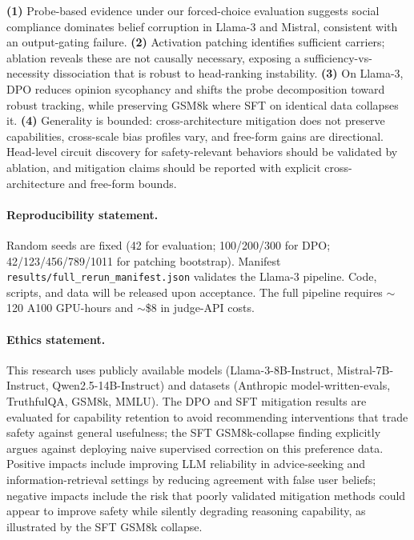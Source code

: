 \documentclass{article}
\begin{document}
\textbf{(1)} Probe-based evidence under our forced-choice evaluation suggests social compliance dominates belief corruption in Llama-3 and Mistral, consistent with an output-gating failure. \textbf{(2)} Activation patching identifies sufficient carriers; ablation reveals these are not causally necessary, exposing a sufficiency-vs-necessity dissociation that is robust to head-ranking instability. \textbf{(3)} On Llama-3, DPO reduces opinion sycophancy and shifts the probe decomposition toward robust tracking, while preserving GSM8k where SFT on identical data collapses it. \textbf{(4)} Generality is bounded: cross-architecture mitigation does not preserve capabilities, cross-scale bias profiles vary, and free-form gains are directional. Head-level circuit discovery for safety-relevant behaviors should be validated by ablation, and mitigation claims should be reported with explicit cross-architecture and free-form bounds.

\paragraph{Reproducibility statement.}
Random seeds are fixed (42 for evaluation; 100/200/300 for DPO; 42/123/456/789/1011 for patching bootstrap). Manifest \texttt{results/full\_rerun\_manifest.json} validates the Llama-3 pipeline. Code, scripts, and data will be released upon acceptance. The full pipeline requires $\sim$120 A100 GPU-hours and $\sim$\$8 in judge-API costs.

\paragraph{Ethics statement.}
This research uses publicly available models (Llama-3-8B-Instruct, Mistral-7B-Instruct, Qwen2.5-14B-Instruct) and datasets (Anthropic model-written-evals, TruthfulQA, GSM8k, MMLU). The DPO and SFT mitigation results are evaluated for capability retention to avoid recommending interventions that trade safety against general usefulness; the SFT GSM8k-collapse finding explicitly argues against deploying naive supervised correction on this preference data. Positive impacts include improving LLM reliability in advice-seeking and information-retrieval settings by reducing agreement with false user beliefs; negative impacts include the risk that poorly validated mitigation methods could appear to improve safety while silently degrading reasoning capability, as illustrated by the SFT GSM8k collapse.



\end{document}
